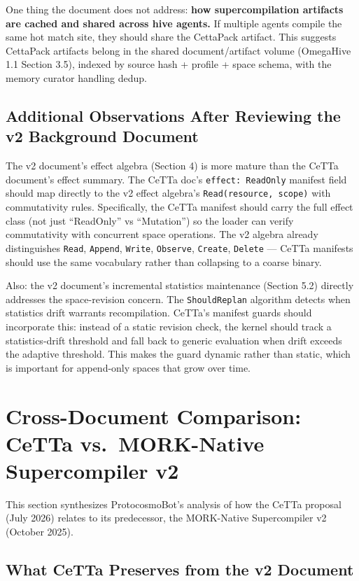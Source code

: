 \documentclass[11pt]{article}
\begin{document}
One thing the document does not address: \textbf{how supercompilation artifacts are cached and shared across hive agents.} If multiple agents compile the same hot match site, they should share the CettaPack artifact. This suggests CettaPack artifacts belong in the shared document/artifact volume (OmegaHive 1.1 Section 3.5), indexed by source hash + profile + space schema, with the memory curator handling dedup.

\subsection{Additional Observations After Reviewing the v2 Background Document}

The v2 document's effect algebra (Section 4) is more mature than the CeTTa document's effect summary. The CeTTa doc's \texttt{effect: ReadOnly} manifest field should map directly to the v2 effect algebra's \texttt{Read(resource, scope)} with commutativity rules. Specifically, the CeTTa manifest should carry the full effect class (not just ``ReadOnly'' vs ``Mutation'') so the loader can verify commutativity with concurrent space operations. The v2 algebra already distinguishes \texttt{Read}, \texttt{Append}, \texttt{Write}, \texttt{Observe}, \texttt{Create}, \texttt{Delete} --- CeTTa manifests should use the same vocabulary rather than collapsing to a coarse binary.

Also: the v2 document's incremental statistics maintenance (Section 5.2) directly addresses the space-revision concern. The \texttt{ShouldReplan} algorithm detects when statistics drift warrants recompilation. CeTTa's manifest guards should incorporate this: instead of a static revision check, the kernel should track a statistics-drift threshold and fall back to generic evaluation when drift exceeds the adaptive threshold. This makes the guard dynamic rather than static, which is important for append-only spaces that grow over time.
\section{Cross-Document Comparison: CeTTa vs.\ MORK-Native Supercompiler v2}

This section synthesizes ProtocosmoBot's analysis of how the CeTTa proposal (July 2026) relates to its predecessor, the MORK-Native Supercompiler v2 (October 2025).

\subsection{What CeTTa Preserves from the v2 Document}
\end{document}
